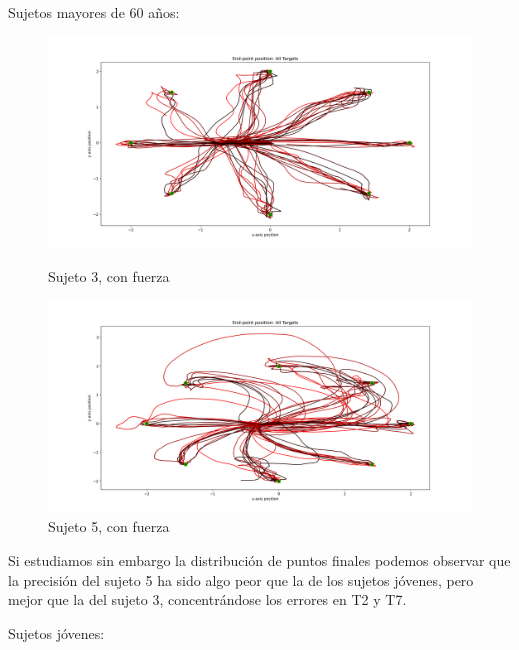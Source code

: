\documentclass[a4paper,11pt, oneside]{book}
\begin{document}
Sujetos mayores de 60 años:
\\
\begin{figure}[h]
	\begin{minipage}[b]{0.5\linewidth}
		\centering
		\includegraphics[width=\linewidth]{sujeto3/force/trayectorias}
		\caption{Sujeto 3, con fuerza}
		\label{fig:figura1}
	\end{minipage}
	\hspace{0.5cm}
	\begin{minipage}[b]{0.5\linewidth}
		\centering
		\includegraphics[width=\linewidth]{sujeto5/force/trayectorias}
		\caption{Sujeto 5, con fuerza}
		\label{fig:figura2}
	\end{minipage}
\end{figure}


Si estudiamos sin embargo la distribución de puntos finales podemos observar que la precisión del sujeto 5 ha sido algo peor que la de los sujetos jóvenes, pero mejor que la del sujeto 3, concentrándose los errores en T2 y T7.

Sujetos jóvenes:
\end{document}
